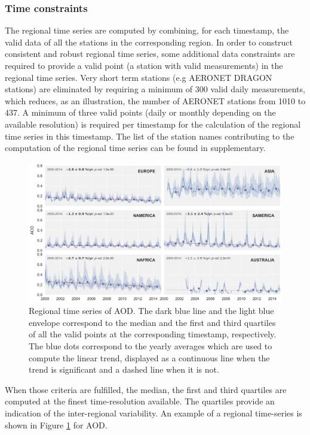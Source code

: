 \documentclass[journal abbreviation, manuscript]{copernicus}
\begin{document}
\subsubsection{Time constraints}
The regional time series are computed by combining, for each timestamp, the valid data of all the stations in the corresponding region. In order to construct consistent and robust regional time series, some additional data constraints are required to provide a valid point (a station with valid measurements) in the regional time series. Very short term stations (e.g AERONET DRAGON stations) are eliminated by requiring a minimum of 300 valid daily measurements, which reduces, as an illustration, the number of AERONET stations from 1010 to 437. A minimum of three valid points (daily or monthly depending on the available resolution) is required per timestamp for the calculation of the regional time series in this timestamp. The list of the station names contributing to the computation of the regional time series can be found in supplementary.

\begin{figure}
 \includegraphics[width=16cm]{../scripts/figs/ts/panel-od550aer.png}
 \caption{Regional time series of AOD. The dark blue line and the light blue envelope correspond to the median and the first and third quartiles of all the valid points at the corresponding timestamp, respectively. The blue dots correspond to the yearly averages which are used to compute the linear trend, displayed as a continuous line when the trend is significant and a dashed line when it is not.}
 \label{fig:ts_aod}
\end{figure}

When those criteria are fulfilled, the median, the first and third quartiles are computed at the finest time-resolution available. The quartiles provide an indication of the inter-regional variability. An example of a regional time-series is shown in Figure \ref{fig:ts_aod} for AOD.
\end{document}
